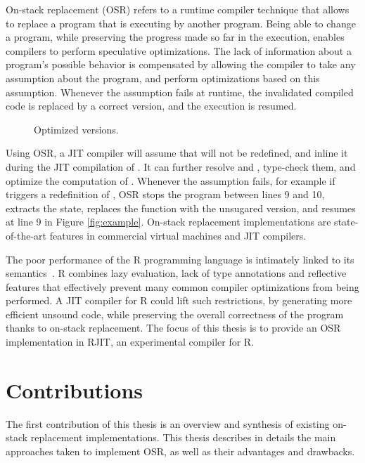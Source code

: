 On-stack replacement (OSR) refers to a runtime compiler technique that allows to replace a program that is executing by another program.
Being able to change a program, while preserving the progress made so far in the execution, enables compilers to perform speculative optimizations.
The lack of information about a program's possible behavior is compensated by allowing the compiler to take any assumption about the program, and perform optimizations based on this assumption.
Whenever the assumption fails at runtime, the invalidated compiled code is replaced by a correct version, and the execution is resumed.\\

\begin{wrapfigure}[13]{l}{6.5cm}
\caption{Optimized versions.}
\end{wrapfigure}
Using OSR, a JIT compiler will assume that  will not be redefined, and inline it during the JIT compilation of .
It can further resolve  and , type-check them, and optimize the computation of .
Whenever the assumption fails, for example if  triggers a redefinition of , OSR stops the program between lines 9 and 10, extracts the state, replaces the function with the unsugared version, and resumes at line 9 in Figure \ref{fig:example}.
On-stack replacement implementations are state-of-the-art features in commercial virtual machines and JIT compilers.

The poor performance of the R programming language is intimately linked to its semantics~\cite{morandat2012evaluating}. R combines lazy evaluation, lack of type annotations and reflective features that effectively prevent many common compiler optimizations from being performed.
A JIT compiler for R could lift such restrictions, by generating more efficient unsound code, while preserving the overall correctness of the program thanks to on-stack replacement.
The focus of this thesis is to provide an OSR implementation in RJIT, an experimental compiler for R.\\

\section{Contributions}
The first contribution of this thesis is an overview and synthesis of existing on-stack replacement implementations.
This thesis describes in details the main approaches taken to implement OSR, as well as their advantages and drawbacks.\\

